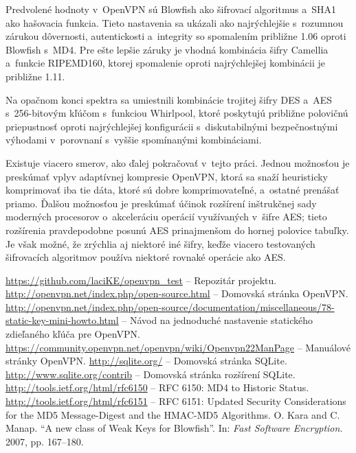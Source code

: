 \documentclass[12pt,a4paper]{article}
\begin{document}
Predvolené hodnoty v~OpenVPN sú Blowfish ako šifrovací algoritmus a~SHA1
ako hašovacia funkcia. Tieto nastavenia sa ukázali ako najrýchlejšie
s~rozumnou zárukou dôvernosti, autentickosti a~integrity so spomalením
približne 1.06 oproti Blowfish s~MD4. Pre ešte lepšie záruky je vhodná
kombinácia šifry Camellia a~funkcie RIPEMD160, ktorej spomalenie oproti
najrýchlejšej kombinácii je približne 1.11.

Na opačnom konci spektra sa umiestnili kombinácie trojitej šifry DES a~AES
s~256-bitovým kľúčom s~funkciou Whirlpool, ktoré poskytujú približne
polovičnú priepustnosť oproti najrýchlejšej konfigurácii s~diskutabilnými
bezpečnostnými výhodami v~porovnaní s~vyššie spomínanými kombináciami.

Existuje viacero smerov, ako ďalej pokračovať v~tejto práci. Jednou
možnosťou je pre\-skú\-mať vplyv adaptívnej kompresie OpenVPN, ktorá sa snaží
heuristicky komprimovať iba tie dáta, ktoré sú dobre komprimovateľné,
a~ostatné prenášať priamo. Ďalšou možnosťou je preskúmať účinok rozšírení
inštrukčnej sady moderných procesorov o~akceleráciu operácií využívaných
v~šifre AES; tieto rozšírenia pravdepodobne posunú AES prinajmenšom do
hornej polovice tabuľky. Je však možné, že zrýchlia aj niektoré iné šifry,
keďže viacero testovaných šifrovacích algoritmov používa niektoré rovnaké
operácie ako AES.

\renewcommand{\refname}{Literatúra}
{}
\begin{thebibliography}{99}
   \url{https://github.com/laciKE/openvpn_test} -- Repozitár projektu.
   \url{http://openvpn.net/index.php/open-source.html} -- Domovská stránka OpenVPN.
   \url{http://openvpn.net/index.php/open-source/documentation/miscellaneous/78-static-key-mini-howto.html} -- Návod na jednoduché nastavenie statického zdieľaného kľúča pre OpenVPN.
   \url{https://community.openvpn.net/openvpn/wiki/Openvpn22ManPage} -- Manuálové stránky OpenVPN.
   \url{http://sqlite.org/} -- Domovská stránka SQLite.
   \url{http://www.sqlite.org/contrib} -- Domovská stránka rozšírení SQLite.
   \url{http://tools.ietf.org/html/rfc6150} -- RFC 6150: MD4 to Historic Status.
   \url{http://tools.ietf.org/html/rfc6151} -- RFC 6151: Updated Security Considerations for the MD5 Message-Digest and the HMAC-MD5 Algorithms.
   O. Kara and C. Manap. ``A new class of Weak Keys for Blowfish''. In: \emph{Fast Software Encryption}. 2007, pp. 167--180.
\end{thebibliography}
\end{document}
